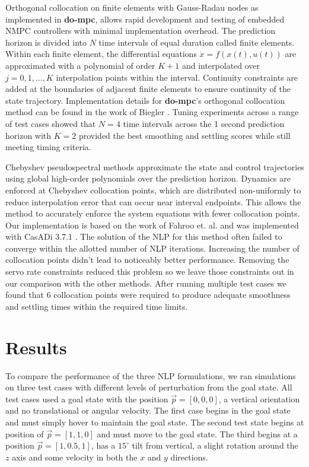 \documentclass[conf]{new-aiaa}
\newcommand{\dompc}{{\bf do-mpc}}
\begin{document}
	
	 Orthogonal collocation on finite elements with Gauss-Radau nodes as implemented in {\dompc}, allows rapid development and testing of embedded NMPC controllers with minimal implementation overhead. 
	The prediction horizon is divided into $N$ time intervals of equal duration called finite elements. 
	Within each finite element, the differential equations $\dot{x} =  f(x(t),u(t))$ are approximated with a polynomial of order $K+1$ and interpolated over $j = 0, 1, \ldots, K$ interpolation points within the interval.
	Continuity constraints are added at the boundaries of adjacent finite elements to ensure continuity of the state trajectory. Implementation details for {\dompc}'s orthogonal collocation method can be found in the work of Biegler  \cite{dompc-oc}.  Tuning experiments across a range of test cases showed that $N=4$ time intervals across the 1 second prediction horizon with $K=2$ provided the best smoothing and settling scores while still meeting timing criteria.

	Chebyshev pseudospectral methods approximate the state and control trajectories using global high-order polynomials over the prediction horizon. Dynamics are enforced at Chebyshev collocation points, which are distributed non-uniformly to reduce interpolation error that can occur near interval endpoints. This allows the method to accurately enforce the system equations with fewer collocation points. Our implementation is based on the work of Fahroo et. al.  \cite{chebyshevPS} and was implemented with CasADi 3.7.1 \cite{casadi}.  The solution of the NLP for this method often failed to converge within the allotted number of NLP iterations. Increasing the number of collocation points didn't lead to noticeably better performance. 
	Removing the servo rate constraints reduced this problem so we leave those constraints  out in our comparison with the other methods. After running multiple test cases we found that $6$ collocation points were required to produce adequate smoothness and settling times within the required time limits.
	

	

	
\section{Results}
\label{results}

	To compare the performance of the three NLP formulations, we ran simulations on three test cases with different levels of perturbation from the goal state.
	All test cases used a goal state with the position $\vec{p} = [0, 0,  0]$, a vertical orientation and no translational or angular velocity.
	The first case begins in the goal state and must simply hover to maintain the goal state. The second test state begins at  position of $\vec{p} = [1, 1, 0]$ and must move to the goal state. The third begins at a position $\vec{p} = [1, 0.5, 1]$, has a $15^{\circ}$ tilt from vertical, a slight rotation around the $z$ axis and some velocity in both the $x$ and $y$ directions.
\end{document}

